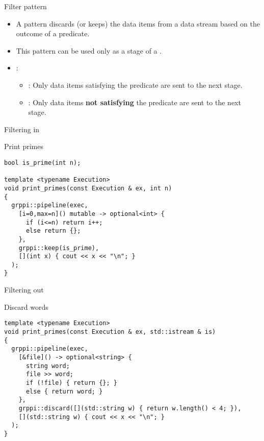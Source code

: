 \begin{frame}[t]{Filter pattern}
\begin{itemize}
  \item A  pattern discards (or keeps) the data items from a 
        data stream based on the outcome of a predicate.
  \item This pattern can be used only as a stage of a .
  \vfill\pause
  \item {}:
    \begin{itemize}
      \item {}: Only data items satisfying the predicate are sent 
            to the next stage.
      \item {}: Only data items \textbf{\alert{not satisfying}} 
            the predicate are sent to the next stage.
    \end{itemize}
\end{itemize}
\end{frame}

\begin{frame}[t,fragile]{Filtering in}
\begin{block}{Print primes}
\begin{lstlisting}
bool is_prime(int n);

template <typename Execution>
void print_primes(const Execution & ex, int n)
{
  grppi::pipeline(exec,
    [i=0,max=n]() mutable -> optional<int> {
      if (i<=n) return i++;
      else return {};
    },
    grppi::keep(is_prime),
    [](int x) { cout << x << "\n"; }
  );
}
\end{lstlisting}
\end{block}
\end{frame}

\begin{frame}[t,fragile]{Filtering out}
\begin{block}{Discard words}
\begin{lstlisting}
template <typename Execution>
void print_primes(const Execution & ex, std::istream & is)
{
  grppi::pipeline(exec,
    [&file]() -> optional<string> {
      string word;
      file >> word;
      if (!file) { return {}; }
      else { return word; }
    },
    grppi::discard([](std::string w) { return w.length() < 4; }),
    [](std::string w) { cout << x << "\n"; }
  );
}
\end{lstlisting}
\end{block}
\end{frame}

